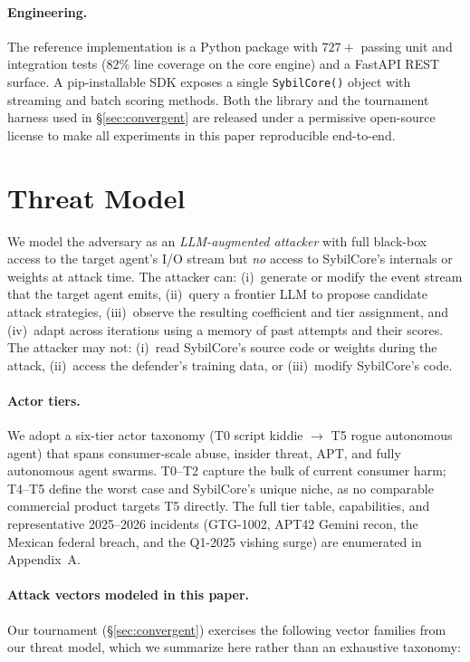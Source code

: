 \documentclass{article}
\begin{document}
\paragraph{Engineering.}
The reference implementation is a Python package with $727{+}$ passing
unit and integration tests ($82\%$ line coverage on the core engine)
and a FastAPI REST surface. A pip-installable SDK exposes a single
\texttt{SybilCore()} object with streaming and batch scoring methods.
Both the library and the tournament harness used in
\S\ref{sec:convergent} are released under a permissive open-source
license to make all experiments in this paper reproducible end-to-end.

\section{Threat Model}
\label{sec:threat}

We model the adversary as an \emph{LLM-augmented attacker} with full
black-box access to the target agent's I/O stream but \emph{no} access
to SybilCore's internals or weights at attack time. The attacker can:
(i)~generate or modify the event stream that the target agent emits,
(ii)~query a frontier LLM to propose candidate attack strategies,
(iii)~observe the resulting coefficient and tier assignment, and
(iv)~adapt across iterations using a memory of past attempts and their
scores. The attacker may not: (i)~read SybilCore's source code or
weights during the attack, (ii)~access the defender's training data,
or (iii)~modify SybilCore's code.

\paragraph{Actor tiers.}
We adopt a six-tier actor taxonomy (T0 script kiddie $\to$ T5 rogue
autonomous agent) that spans consumer-scale abuse, insider threat,
APT, and fully autonomous agent swarms. T0--T2 capture the bulk of
current consumer harm; T4--T5 define the worst case and SybilCore's
unique niche, as no comparable commercial product targets T5 directly.
The full tier table, capabilities, and representative 2025--2026
incidents (GTG-1002, APT42 Gemini recon, the Mexican federal breach,
and the Q1-2025 vishing surge) are enumerated in Appendix~A.

\paragraph{Attack vectors modeled in this paper.}
Our tournament (\S\ref{sec:convergent}) exercises the following vector
families from our threat model, which we summarize here rather than
an exhaustive taxonomy:
\end{document}
